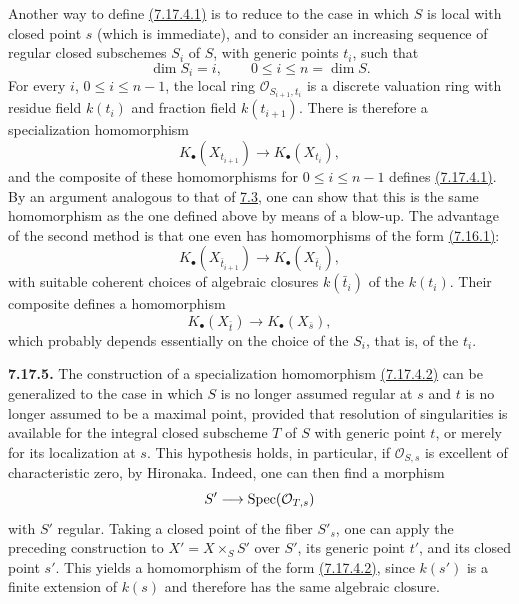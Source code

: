 Another way to define \hyperlink{sga6.e10.eq.7-17-4-1}{(7.17.4.1)} is to reduce to the case in which $S$ is
local with closed point $s$ (which is immediate), and to consider an
increasing sequence of regular closed subschemes $S_i$ of $S$, with generic
points $t_i$, such that
\[
\dim S_i=i,\qquad 0\leq i\leq n=\dim S.
\]
For every $i$, $0\leq i\leq n-1$, the local ring
$\mathcal O_{S_{i+1},t_i}$ is a discrete valuation ring with residue field
$k(t_i)$ and fraction field $k(t_{i+1})$. There is therefore a
specialization homomorphism
\[
K_\bullet(X_{t_{i+1}})\longrightarrow K_\bullet(X_{t_i}),
\]
and the composite of these homomorphisms for $0\leq i\leq n-1$ defines
\hyperlink{sga6.e10.eq.7-17-4-1}{(7.17.4.1)}. By an argument analogous to that of \hyperlink{sga6.e10.prop.7-3}{7.3}, one can show that this
is the same homomorphism as the one defined above by means of a blow-up. The
advantage of the second method is that one even has homomorphisms of the
form \hyperlink{sga6.e10.eq.7-16-1}{(7.16.1)}:
\[
K_\bullet(X_{\bar t_{i+1}})\longrightarrow
K_\bullet(X_{\bar t_i}),
\]
with suitable coherent choices of algebraic closures $k(\bar t_i)$ of the
$k(t_i)$. Their composite defines a homomorphism
\begin{equation}\tag{7.17.4.2}
K_\bullet(X_{\bar t})\longrightarrow K_\bullet(X_{\bar s}),
\end{equation}
which probably depends essentially on the choice of the $S_i$, that is, of
the $t_i$.

\textbf{7.17.5.}
The construction of a specialization homomorphism \hyperlink{sga6.e10.eq.7-17-4-2}{(7.17.4.2)} can be
generalized to the case in which $S$ is no longer assumed regular at $s$
and $t$ is no longer assumed to be a maximal point, provided that resolution
of singularities is available for the integral closed subscheme $T$ of $S$
with generic point $t$, or merely for its localization at $s$. This
hypothesis holds, in particular, if $\mathcal O_{S,s}$ is excellent of
characteristic zero, by Hironaka. Indeed, one can then find a morphism
\[
S'\longrightarrow\operatorname{Spec}(\mathcal O_{T,s})
\]
with $S'$ regular. Taking a closed point of the fiber $S'_s$, one can apply
the preceding construction to $X'=X\times_SS'$ over $S'$, its generic point
$t'$, and its closed point $s'$. This yields a homomorphism of the form
\hyperlink{sga6.e10.eq.7-17-4-2}{(7.17.4.2)}, since $k(s')$ is a finite extension of $k(s)$ and therefore has
the same algebraic closure.

